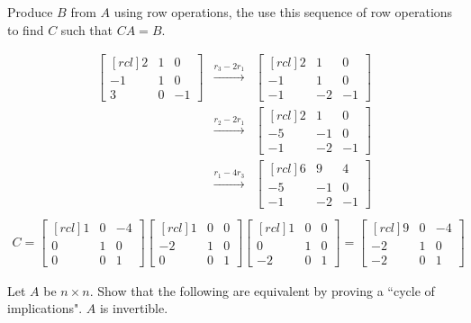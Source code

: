 Produce $B$ from $A$ using row operations, the use this sequence of row operations to find $C$ such that $CA =B$.
\\
\begin{solution}
\begin{eqnarray*}
\begin{bmatrix}[rcl]
2&1&0\\
-1&1&0\\
3&0&-1
\end{bmatrix}
&\xrightarrow[]{r_3 - 2r_1}&
\begin{bmatrix}[rcl]
2&1&0\\
-1&1&0\\
-1&-2&-1
\end{bmatrix}
\\
&\xrightarrow[]{r_2 - 2r_1}&
\begin{bmatrix}[rcl]
2&1&0\\
-5&-1&0\\
-1&-2&-1
\end{bmatrix}
\\
&\xrightarrow[]{r_1 - 4r_3}&
\begin{bmatrix}[rcl]
6&9&4\\
-5&-1&0\\
-1&-2&-1
\end{bmatrix}\\
\end{eqnarray*}
\begin{eqnarray*}
C = 
\begin{bmatrix}[rcl]
1&0&-4\\
0&1&0\\
0&0&1
\end{bmatrix}
\begin{bmatrix}[rcl]
1&0&0\\
-2&1&0\\
0&0&1
\end{bmatrix}
\begin{bmatrix}[rcl]
1&0&0\\
0&1&0\\
-2&0&1
\end{bmatrix}
=
\begin{bmatrix}[rcl]
9&0&-4\\
-2&1&0\\
-2&0&1
\end{bmatrix}
\end{eqnarray*}
\end{solution}
\ii Let $A$ be $n\times n$. Show that the following are equivalent by proving a ``cycle of implications". 
\bb[(i)]
\ii $A$ is invertible. 
